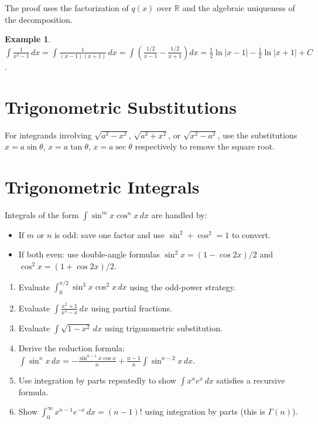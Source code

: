 \documentclass[12pt, openany]{book}
\theoremstyle{plain}
\theoremstyle{definition}
\newtheorem{example}[theorem]{Example}
\theoremstyle{remark}
\newcommand{\R}{\mathbb{R}}
\begin{document}
The proof uses the factorization of $q(x)$ over $\R$ and the algebraic uniqueness of the decomposition.

\begin{example}
$\int \frac{1}{x^2-1}\,dx = \int \frac{1}{(x-1)(x+1)}\,dx = \int \left(\frac{1/2}{x-1} - \frac{1/2}{x+1}\right)dx = \frac{1}{2}\ln|x-1| - \frac{1}{2}\ln|x+1| + C$.
\end{example}

\section{Trigonometric Substitutions}

For integrands involving $\sqrt{a^2-x^2}$, $\sqrt{a^2+x^2}$, or $\sqrt{x^2-a^2}$, use the substitutions $x = a\sin\theta$, $x = a\tan\theta$, $x = a\sec\theta$ respectively to remove the square root.

\section{Trigonometric Integrals}

Integrals of the form $\int \sin^m x \cos^n x\,dx$ are handled by:
\begin{itemize}[noitemsep]
  \item If $m$ or $n$ is odd: save one factor and use $\sin^2 + \cos^2 = 1$ to convert.
  \item If both even: use double-angle formulas $\sin^2 x = (1-\cos 2x)/2$ and $\cos^2 x = (1+\cos 2x)/2$.
\end{itemize}

\begin{exbox}
\begin{enumerate}
  \item Evaluate $\int_0^{\pi/2} \sin^3 x \cos^2 x\,dx$ using the odd-power strategy.
  \item Evaluate $\int \frac{x^2+1}{x^3-x}\,dx$ using partial fractions.
  \item Evaluate $\int \sqrt{1-x^2}\,dx$ using trigonometric substitution.
  \item Derive the reduction formula: $\int \sin^n x\,dx = -\frac{\sin^{n-1}x\cos x}{n} + \frac{n-1}{n}\int\sin^{n-2}x\,dx$.
  \item Use integration by parts repeatedly to show $\int x^n e^x\,dx$ satisfies a recursive formula.
  \item Show $\int_0^\infty x^{n-1}e^{-x}\,dx = (n-1)!$ using integration by parts (this is $\Gamma(n)$).
\end{enumerate}
\end{exbox}
\color{black}
\end{document}
